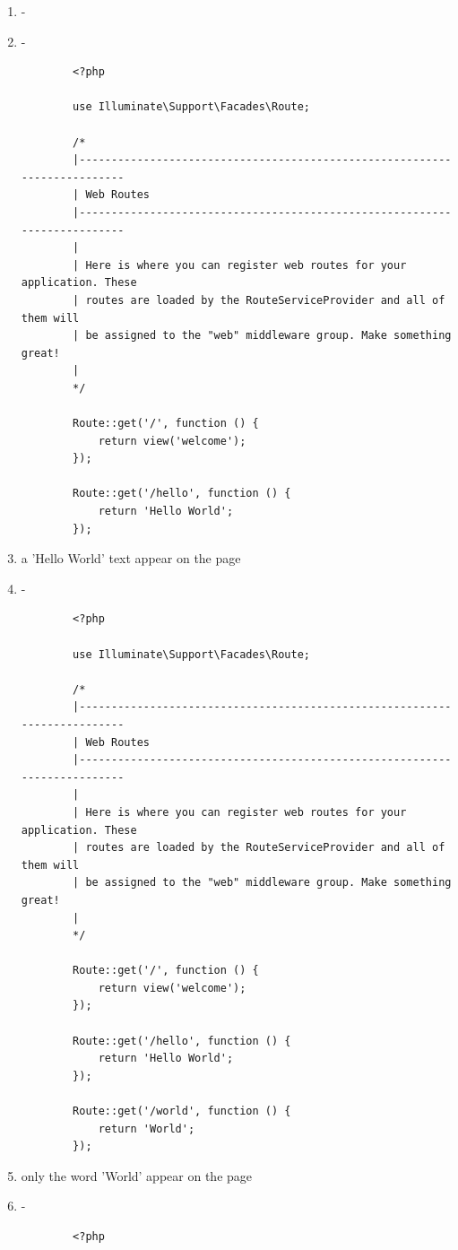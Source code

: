 \documentclass[12pt,titlepage]{article}
\begin{document}
\begin{enumerate}[label=\alph*.]
    \item -
    \item -
    \begin{verbatim}
        <?php

        use Illuminate\Support\Facades\Route;
        
        /*
        |--------------------------------------------------------------------------
        | Web Routes
        |--------------------------------------------------------------------------
        |
        | Here is where you can register web routes for your application. These
        | routes are loaded by the RouteServiceProvider and all of them will
        | be assigned to the "web" middleware group. Make something great!
        |
        */
        
        Route::get('/', function () {
            return view('welcome');
        });
        
        Route::get('/hello', function () {
            return 'Hello World';
        });
    \end{verbatim}
    \item a 'Hello World' text appear on the page
    \newpage
    \item -
    \begin{verbatim}
        <?php

        use Illuminate\Support\Facades\Route;
        
        /*
        |--------------------------------------------------------------------------
        | Web Routes
        |--------------------------------------------------------------------------
        |
        | Here is where you can register web routes for your application. These
        | routes are loaded by the RouteServiceProvider and all of them will
        | be assigned to the "web" middleware group. Make something great!
        |
        */
        
        Route::get('/', function () {
            return view('welcome');
        });
        
        Route::get('/hello', function () {
            return 'Hello World';
        });
        
        Route::get('/world', function () {
            return 'World';
        }); 
    \end{verbatim}
    \item only the word 'World' appear on the page
    \newpage
    \item -
    \begin{verbatim}
        <?php


\end{verbatim}
\end{enumerate}
\end{document}
